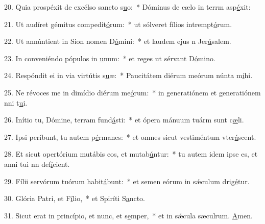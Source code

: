 20. Quia prospéxit de excélso sancto s\uline{u}o:~* Dóminus de cælo in terrm asp\uline{é}xit:\par 
21. Ut audíret gémitus compedit\uline{ó}rum:~* ut sólveret fílios intrempt\uline{ó}rum.\par 
22. Ut annúntient in Sion nomen D\uline{ó}mini:~* et laudem ejus n Jer\uline{ú}salem.\par 
23. In conveniéndo pópulos in \uline{u}num:~* et reges ut sérvant D\uline{ó}mino.\par 
24. Respóndit ei in via virtútis s\uline{u}æ:~* Paucitátem diérum meórum núnta m\uline{i}hi.\par 
25. Ne révoces me in dimídio diérum me\uline{ó}rum:~* in generatiónem et generatiónem nni t\uline{u}i.\par 
26. Inítio tu, Dómine, terram fund\uline{á}sti:~* et ópera mánuum tuárm sunt c\uline{æ}li.\par 
27. Ipsi períbunt, tu autem p\uline{é}rmanes:~* et omnes sicut vestiméntum vter\uline{á}scent.\par 
28. Et sicut opertórium mutábis eos, et mutab\uline{ú}ntur:~* tu autem idem ipse es, et anni tui nn def\uline{í}cient.\par 
29. Fílii servórum tuórum habit\uline{á}bunt:~* et semen eórum in sǽculum drig\uline{é}tur.\par 
30. Glória Patri, et F\uline{í}lio,~* et Spiríti S\uline{a}ncto.\par 
31. Sicut erat in princípio, et nunc, et s\uline{e}mper,~* et in sǽcula sæculrum. \uline{A}men.\par 
